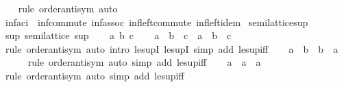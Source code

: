 \begin{isabellebody}
%
\isadelimproof
\ \ %
\endisadelimproof
%
\isatagproof
{}\isamarkupfalse%
\ {\isacharparenleft}{\kern0pt}rule\ order{\isachardot}{\kern0pt}antisym{\isacharparenright}{\kern0pt}\ auto%
\endisatagproof
{\isafoldproof}%
%
\isadelimproof
\isanewline
%
\endisadelimproof
\isanewline
{}\isamarkupfalse%
\ inf{\isacharunderscore}{\kern0pt}aci\ {\isacharequal}{\kern0pt}\ inf{\isacharunderscore}{\kern0pt}commute\ inf{\isacharunderscore}{\kern0pt}assoc\ inf{\isacharunderscore}{\kern0pt}left{\isacharunderscore}{\kern0pt}commute\ inf{\isacharunderscore}{\kern0pt}left{\isacharunderscore}{\kern0pt}idem\isanewline
\isanewline
{}\isamarkupfalse%
\isanewline
\isanewline
{}\isamarkupfalse%
\ semilattice{\isacharunderscore}{\kern0pt}sup\isanewline
{}\isanewline
\isanewline
{}\isamarkupfalse%
\ sup{\isacharcolon}{\kern0pt}\ semilattice\ sup\isanewline
%
\isadelimproof
%
\endisadelimproof
%
\isatagproof
{}\isamarkupfalse%
\isanewline
\ \ \isamarkupfalse%
\ a\ b\ c\isanewline
\ \ \isamarkupfalse%
\ {\isachardoublequoteopen}{\isacharparenleft}{\kern0pt}a\ {\isasymsqunion}\ b{\isacharparenright}{\kern0pt}\ {\isasymsqunion}\ c\ {\isacharequal}{\kern0pt}\ a\ {\isasymsqunion}\ {\isacharparenleft}{\kern0pt}b\ {\isasymsqunion}\ c{\isacharparenright}{\kern0pt}{\isachardoublequoteclose}\isanewline
\ \ \ \ \isamarkupfalse%
\ {\isacharparenleft}{\kern0pt}rule\ order{\isachardot}{\kern0pt}antisym{\isacharparenright}{\kern0pt}\ {\isacharparenleft}{\kern0pt}auto\ intro{\isacharcolon}{\kern0pt}\ le{\isacharunderscore}{\kern0pt}supI{}\ le{\isacharunderscore}{\kern0pt}supI{}\ simp\ add{\isacharcolon}{\kern0pt}\ le{\isacharunderscore}{\kern0pt}sup{\isacharunderscore}{\kern0pt}iff{\isacharparenright}{\kern0pt}\isanewline
\ \ \isamarkupfalse%
\ {\isachardoublequoteopen}a\ {\isasymsqunion}\ b\ {\isacharequal}{\kern0pt}\ b\ {\isasymsqunion}\ a{\isachardoublequoteclose}\isanewline
\ \ \ \ \isamarkupfalse%
\ {\isacharparenleft}{\kern0pt}rule\ order{\isachardot}{\kern0pt}antisym{\isacharparenright}{\kern0pt}\ {\isacharparenleft}{\kern0pt}auto\ simp\ add{\isacharcolon}{\kern0pt}\ le{\isacharunderscore}{\kern0pt}sup{\isacharunderscore}{\kern0pt}iff{\isacharparenright}{\kern0pt}\isanewline
\ \ \isamarkupfalse%
\ {\isachardoublequoteopen}a\ {\isasymsqunion}\ a\ {\isacharequal}{\kern0pt}\ a{\isachardoublequoteclose}\isanewline
\ \ \ \ \isamarkupfalse%
\ {\isacharparenleft}{\kern0pt}rule\ order{\isachardot}{\kern0pt}antisym{\isacharparenright}{\kern0pt}\ {\isacharparenleft}{\kern0pt}auto\ simp\ add{\isacharcolon}{\kern0pt}\ le{\isacharunderscore}{\kern0pt}sup{\isacharunderscore}{\kern0pt}iff{\isacharparenright}{\kern0pt}\isanewline

\end{isabellebody}
